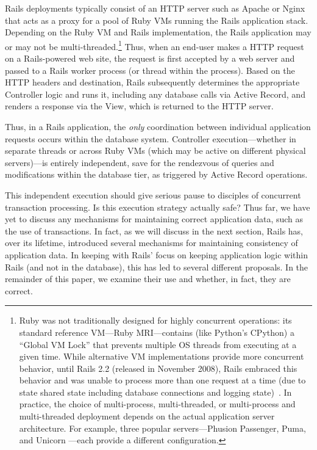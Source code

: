 Rails deployments typically consist of an HTTP server such as Apache or Nginx that acts as a proxy for a pool of Ruby VMs running the Rails application stack. Depending on the Ruby VM and Rails implementation, the Rails application may or may not be multi-threaded.\footnote{Ruby was not traditionally designed for highly concurrent operations: its standard reference VM---Ruby MRI---contains (like Python's CPython) a ``Global VM Lock'' that prevents multiple OS threads from executing at a given time. While alternative VM implementations provide more concurrent behavior, until Rails 2.2 (released in November 2008), Rails embraced this behavior and was unable to process more than one request at a time (due to state shared state including database connections and logging state)~\cite{rails-threading}. In practice, the choice of multi-process, multi-threaded, or multi-process and multi-threaded deployment depends on the actual application server architecture. For example, three popular servers---Phusion Passenger, Puma, and Unicorn ---each provide a different configuration.} Thus, when an end-user makes a HTTP request on a Rails-powered web site, the request is first accepted by a web server and passed to a Rails worker process (or thread within the process). Based on the HTTP headers and destination, Rails subsequently determines the appropriate Controller logic and runs it, including any database calls via Active Record, and renders a response via the View, which is returned to the HTTP server.

Thus, in a Rails application, the \textit{only} coordination between individual application requests occurs within the database system. Controller execution---whether in separate threads or across Ruby VMs (which may be active on different physical servers)---is entirely independent, save for the rendezvous of queries and modifications within the database tier, as triggered by Active Record operations.

This independent execution should give serious pause to disciples of concurrent transaction processing. Is this execution strategy actually safe? Thus far, we have yet to discuss any mechanisms for maintaining correct application data, such as the use of transactions. In fact, as we will discuss in the next section, Rails has, over its lifetime, introduced several mechanisms for maintaining consistency of application data. In keeping with Rails' focus on keeping application logic within Rails (and not in the database), this has led to several different proposals. In the remainder of this paper, we examine their use and whether, in fact, they are correct.



